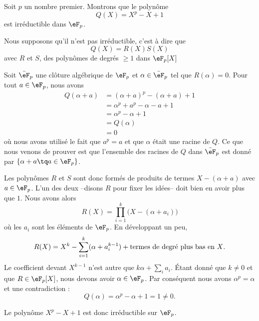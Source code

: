 \begin{example}     \label{ExfUqQXQ}
    Soit \( p\) un nombre premier. Montrons que le polynôme 
    \begin{equation}
        Q(X)=X^p-X+1
    \end{equation}
    est irréductible dans \( \eF_p\). 

    Nous supposons qu'il n'est pas irréductible, c'est à dire que
    \begin{equation}
        Q(X)=R(X)S(X)
    \end{equation}
    avec \( R\) et \( S\), des polynômes de degrés \( \geq 1\) dans \( \eF_p[X]\)

    Soit \( \bar\eF_p\) une clôture algébrique de \( \eF_p\) et \( \alpha\in \bar \eF_p\) tel que \( R(\alpha)=0\). Pour tout \( a\in \eF_p\), nous avons
    \begin{subequations}
        \begin{align}
            Q(\alpha+a)&=(\alpha+a)^p-(\alpha+a)+1\\
            &=\alpha^p+a^p-\alpha-a+1\\
            &=\alpha^p-\alpha+1\\
            &=Q(\alpha)\\
            &=0
        \end{align}
    \end{subequations}
    où nous avons utilisé le fait que \( a^p=a\) et que \( \alpha\) était une racine de \( Q\). Ce que nous venons de prouver est que l'ensemble des racines de \( Q\) dans \( \bar\eF_p\) est donné par \( \{ \alpha+a\tq a\in \eF_p \}\).

    Les polynômes \( R\) et \( S\) sont donc formés de produits de termes \( X-(\alpha+a)\) avec \( a\in \eF_p\). L'un des deux --disons \( R\) pour fixer les idées-- doit bien en avoir plus que \( 1\). Nous avons alors
    \begin{equation}
        R(X)=\prod_{i=1}^{k}\big( X-(\alpha+a_i) \big)
    \end{equation}
    où les \( a_i\) sont les éléments de \( \eF_p\). En développant un peu,
    \begin{equation}
        R(X)=X^k-\sum_{i=1}^k(\alpha+a_i^{k-1})+\text{termes de degré plus bas en \( X\)}.
    \end{equation}
    Le coefficient devant \( X^{k-1}\) n'est autre que \( k\alpha+\sum_ia_i\). Étant donné que \( k\neq 0\) et que \( R\in \eF_p[X]\), nous devons avoir \( \alpha\in \eF_p\). Par conséquent nous avons \( \alpha^p=\alpha\) et une contradiction :
    \begin{equation}
        Q(\alpha)=\alpha^p-\alpha+1=1\neq 0.
    \end{equation}

    Le polynôme \( X^p-X+1\) est donc irréductible sur \( \eF_p\).
\end{example}
